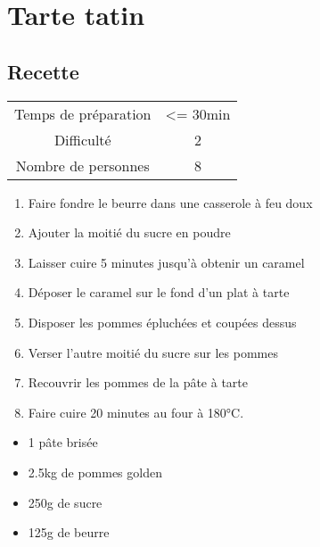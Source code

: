 \newpage
\section{Tarte tatin}
    \label{sec:Tarte tatin}
    \subsection{Recette}
    \vspace{1cm}


    \begin{center}
        \begin{tabular}{c|c}
            Temps de préparation & <= 30min \\
            Difficulté & 2 \\
            Nombre de personnes & 8 
        \end{tabular}
    \end{center}{}

    \vspace{1cm}
    \hline
    \vspace{1cm}

    \begin{minipage}{.7\textwidth}
        \begin{enumerate}
            \item Faire fondre le beurre dans une casserole à feu doux
	    \item Ajouter la moitié du sucre en poudre
	    \item Laisser cuire 5 minutes jusqu'à obtenir un caramel
	    \item Déposer le caramel sur le fond d'un plat à tarte
	    \item Disposer les pommes épluchées et coupées dessus
	    \item Verser l'autre moitié du sucre sur les pommes
	    \item Recouvrir les pommes de la pâte à tarte
	    \item Faire cuire 20 minutes au four à 180°C.

        \end{enumerate}
    \end{minipage}
    \begin{minipage}{.3\textwidth}
        \begin{flushleft}
        \begin{itemize}
            \item 1 pâte brisée
	    \item 2.5kg de pommes golden
	    \item 250g de sucre
	    \item 125g de beurre

        \end{itemize}
        \end{flushleft}
    \end{minipage}
    
